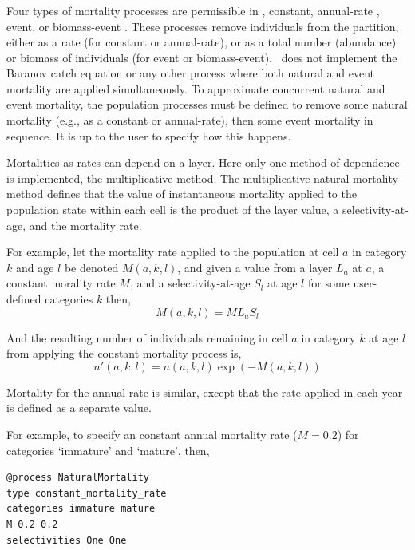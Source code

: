 \subsubsection{\label{sec:mortality}}

Four types of mortality processes are permissible in \SPM, constant, annual-rate \NYI, event, or biomass-event \NYI. These processes remove individuals from the partition, either as a rate (for constant or annual-rate), or as a total number (abundance) or biomass of individuals (for event or biomass-event). \SPM\ does not implement the Baranov catch equation or any other process where both natural and event mortality are applied simultaneously. To approximate concurrent natural and event mortality, the population processes must be defined to remove some natural mortality (e.g., as a constant or annual-rate), then some event mortality in sequence. It is up to the user to specify how this happens.

Mortalities as rates can depend on a layer. Here only one method of dependence is implemented, the multiplicative method. The multiplicative natural mortality method defines that the value of instantaneous mortality applied to the population state within each cell is the product of the layer value, a selectivity-at-age, and the mortality rate. 

For example, let the mortality rate applied to the population at cell $a$ in category $k$ and age $l$ be denoted $M(a,k,l)$, and given a value from a layer $L_a$  at $a$, a constant morality rate $M$, and a selectivity-at-age $S_l$ at age $l$ for some user-defined categories $k$ then, 
\begin{equation}
  M(a,k,l) = ML_a S_l 
\end{equation}

And the resulting number of individuals remaining in cell $a$ in category $k$ at age $l$ from applying the constant mortality process is,
\begin{equation}
  n'(a,k,l) = n(a,k,l) \exp \left({-M(a,k,l)}\right)
\end{equation}

Mortality for the annual rate is similar, except that the rate applied in each year is defined as a separate value. 

For example, to specify an constant annual mortality rate ($M=0.2$) for categories `immature' and `mature', then, 

\begin{verbatim}
@process NaturalMortality
type constant_mortality_rate
categories immature mature
M 0.2 0.2
selectivities One One
\end{verbatim}

